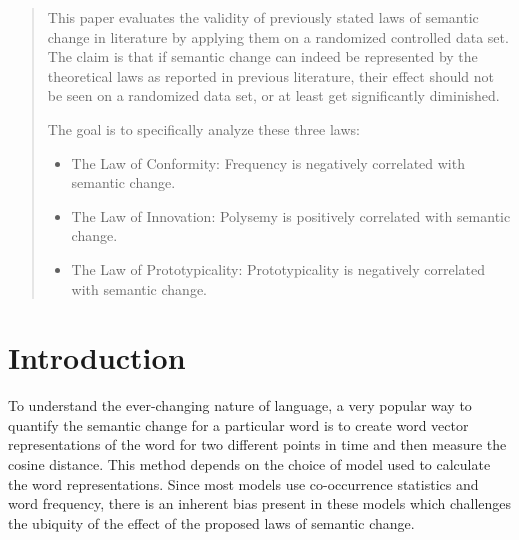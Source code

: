 \documentclass[a0,landscape]{a0poster}
\begin{document}
\vspace{1cm} %


\begin{multicols}{4} %


\color{Navy} %

\begin{abstract}

This paper evaluates the validity of previously stated laws of semantic change in literature by applying them on a randomized controlled data set. The claim is that if semantic change can indeed be represented by the theoretical laws as reported in previous literature, their effect should not be seen on a randomized data set, or at least get significantly diminished.

The goal is to specifically analyze these three laws:

\begin{itemize}
  \item The Law of Conformity: Frequency is negatively correlated with semantic change.
  \item The Law of Innovation: Polysemy is positively correlated with semantic change.
  \item The Law of Prototypicality: Prototypicality is negatively correlated with semantic change.
\end{itemize}

\end{abstract}


\color{SaddleBrown} %

\section*{Introduction}
To understand the ever-changing nature of language, a very popular way to quantify the semantic change for a particular word is to create word vector representations of the word for two different points in time and then measure the cosine distance. This method depends on the choice of model used to calculate the word representations. Since most models use co-occurrence statistics and word frequency, there is an inherent bias present in these models which challenges the ubiquity of the effect of the proposed laws of semantic change.


\end{multicols}
\end{document}
